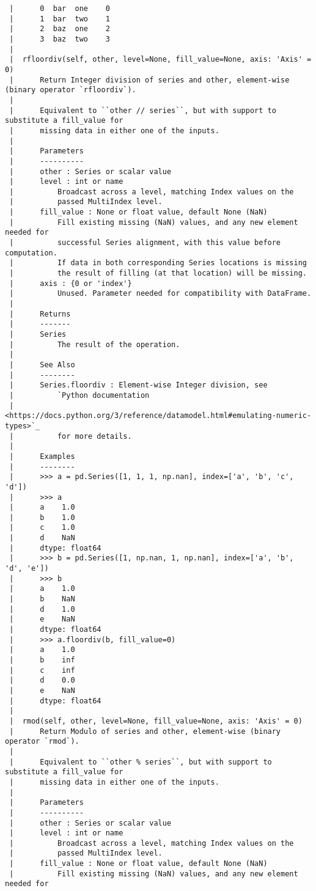 \documentclass[
  letterpaper,
  DIV=11,
  numbers=noendperiod]{scrreprt}
\begin{document}
\begin{verbatim}
 |      0  bar  one    0
 |      1  bar  two    1
 |      2  baz  one    2
 |      3  baz  two    3
 |  
 |  rfloordiv(self, other, level=None, fill_value=None, axis: 'Axis' = 0)
 |      Return Integer division of series and other, element-wise (binary operator `rfloordiv`).
 |      
 |      Equivalent to ``other // series``, but with support to substitute a fill_value for
 |      missing data in either one of the inputs.
 |      
 |      Parameters
 |      ----------
 |      other : Series or scalar value
 |      level : int or name
 |          Broadcast across a level, matching Index values on the
 |          passed MultiIndex level.
 |      fill_value : None or float value, default None (NaN)
 |          Fill existing missing (NaN) values, and any new element needed for
 |          successful Series alignment, with this value before computation.
 |          If data in both corresponding Series locations is missing
 |          the result of filling (at that location) will be missing.
 |      axis : {0 or 'index'}
 |          Unused. Parameter needed for compatibility with DataFrame.
 |      
 |      Returns
 |      -------
 |      Series
 |          The result of the operation.
 |      
 |      See Also
 |      --------
 |      Series.floordiv : Element-wise Integer division, see
 |          `Python documentation
 |          <https://docs.python.org/3/reference/datamodel.html#emulating-numeric-types>`_
 |          for more details.
 |      
 |      Examples
 |      --------
 |      >>> a = pd.Series([1, 1, 1, np.nan], index=['a', 'b', 'c', 'd'])
 |      >>> a
 |      a    1.0
 |      b    1.0
 |      c    1.0
 |      d    NaN
 |      dtype: float64
 |      >>> b = pd.Series([1, np.nan, 1, np.nan], index=['a', 'b', 'd', 'e'])
 |      >>> b
 |      a    1.0
 |      b    NaN
 |      d    1.0
 |      e    NaN
 |      dtype: float64
 |      >>> a.floordiv(b, fill_value=0)
 |      a    1.0
 |      b    inf
 |      c    inf
 |      d    0.0
 |      e    NaN
 |      dtype: float64
 |  
 |  rmod(self, other, level=None, fill_value=None, axis: 'Axis' = 0)
 |      Return Modulo of series and other, element-wise (binary operator `rmod`).
 |      
 |      Equivalent to ``other % series``, but with support to substitute a fill_value for
 |      missing data in either one of the inputs.
 |      
 |      Parameters
 |      ----------
 |      other : Series or scalar value
 |      level : int or name
 |          Broadcast across a level, matching Index values on the
 |          passed MultiIndex level.
 |      fill_value : None or float value, default None (NaN)
 |          Fill existing missing (NaN) values, and any new element needed for

\end{verbatim}
\end{document}
